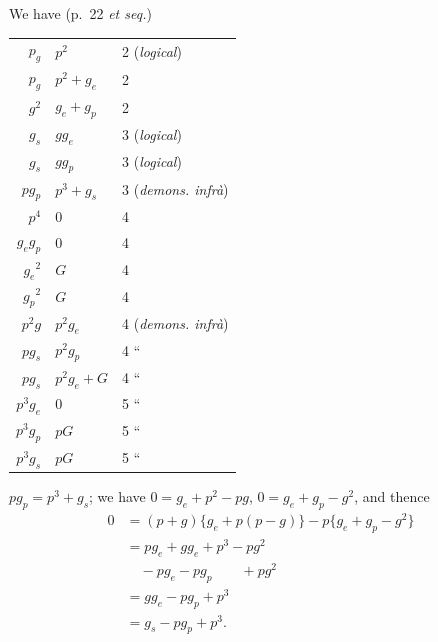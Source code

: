 \documentclass[11pt,a4paper]{book}
\begin{document}
We have (p.\ 22 \textit{et seq.})

\begin{center}
\begin{tabular}{r @{\ $=$\ }l @{\qquad} l}
$p_g$ & $p^2$ & 2 (\textit{logical}) \\
$p_g$ & $p^2 + g_e$ & 2 \\
$g^2$ & $g_e + g_p$ & 2 \\
$g_s$ & $gg_e$ & 3 (\textit{logical}) \\
$g_s$ & $gg_p$ & 3 (\textit{logical}) \\
$pg_p$ & $p^3 + g_s$ & 3 (\textit{demons. infr\`{a}}) \\
$p^4$ & $0$ & 4 \\
$g_eg_p$ & $0$ & 4 \\
${g_e}^2$ & $G$ & 4 \\
${g_p}^2$ & $G$ & 4 \\
$p^2g$ & $p^2g_e$ & 4 (\textit{demons. infr\`{a}}) \\
$pg_s$ & $p^2g_p$ & 4 \hspace{2em} `` \hspace{2em} \\
$pg_s$ & $p^2g_e + G$ & 4 \hspace{2em} `` \hspace{2em} \\
$p^3g_e$ & $0$ & 5 \hspace{2em} `` \hspace{2em} \\
$p^3g_p$ & $pG$ & 5 \hspace{2em} `` \hspace{2em} \\
$p^3g_s$ & $pG$ & 5 \hspace{2em} `` \hspace{2em} \\
\end{tabular}
\end{center}

$pg_p = p^3 + g_s$; we have $0 = g_e + p^2 - pg$, $0 = g_e + g_p - g^2$, and thence
\begin{align*}
0 &= (p + g)\{g_e + p(p-g)\} - p\{g_e + g_p - g^2\} \\
&= pg_e + gg_e + p^3 - pg^2 \\
&\quad - pg_e - pg_p \quad\quad + pg^2 \\
&= gg_e - pg_p + p^3 \\
&= g_s - pg_p + p^3.
\end{align*}
\end{document}
